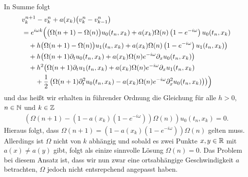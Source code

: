 In Summe folgt
\begin{align}\label{eq:wkb:difflsg}
\begin{split}
&v^{n+1}_k - v^n_k + a(x_k) \bigl( v^n_k - v^n_{k-1} \bigr)\\
&= e^{i \omega k} \Bigl(
\bigl(\Omega(n+1) - \Omega(n) \bigr) u_0(t_n, x_k) + a(x_k) \Omega(n) \left(1-e^{-i \omega}\right) u_0(t_n, x_k)\\
&\quad + h \bigl(\Omega(n+1) - \Omega(n) \bigr) u_1(t_n, x_k) + a(x_k) \Omega(n) \left(1-e^{-i \omega}\right) u_1(t_n, x_k) \bigr)\\
&\quad + h \bigl( \Omega(n+1) \partial_t u_0(t_n, x_k) + a(x_k) \Omega(n) e^{-i \omega} \partial_x u_0(t_n, x_k) \bigr)\\
&\quad + h^2 \bigl( \Omega(n+1) \partial_t u_1(t_n, x_k) + a(x_k) \Omega(n) e^{-i \omega} \partial_x u_1(t_n, x_k)\\
&\qquad + \frac{1}{2} \left( \Omega(n+1) \partial^2_t u_0(t_n, x_k) - a(x_k) \Omega(n) e^{-i \omega} \partial^2_x u_0(t_n, x_k) \right) \bigr) 
\Bigr)
\end{split}
\end{align}
und das heißt wir erhalten in führender Ordnung die Gleichung für alle $h > 0$, $n \in \mathbb N$ und $k \in \mathbb Z$
\begin{align}
\left( \Omega(n+1) - \left( 1 - a(x_k) \left(1-e^{-i \omega}\right) \right) \Omega(n) \right) u_0(t_n, x_k) = 0.
\end{align}
Hieraus folgt, dass 
$\Omega(n+1) = \left( 1 - a(x_k) \left(1-e^{-i \omega}\right) \right) \Omega(n)$
gelten muss.
Allerdings ist $\Omega$ nicht von $k$ abhängig und sobald es zwei Punkte $x,y \in \mathbb R$ mit $a(x) \neq a(y)$ gibt, folgt als einize sinnvolle Lösung $\Omega(n) = 0$.
Das Problem bei diesem Ansatz ist, dass wir nun zwar eine ortsabhängige Geschwindigkeit $a$ betrachten, $\Omega$ jedoch nicht entsrepchend angepasst haben.

